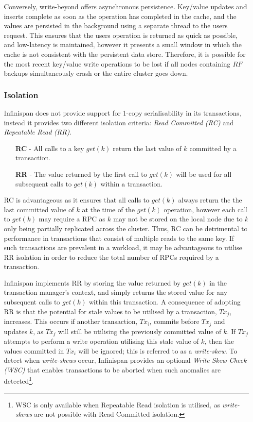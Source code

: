 		    Conversely, write-beyond offers asynchronous persistence.  Key/value updates and inserts complete as soon as the operation has completed in the cache, and the values are persisted in the background using a separate thread to the users request.  This ensures that the users operation is returned as quick as possible, and low-latency is maintained, however it presents a small window in which the cache is not consistent with the persistent data store.  Therefore, it is possible for the most recent key/value write operations to be lost if all nodes containing $RF$ backups simultaneously crash or the entire cluster goes down.  
    
	        \subsubsection*{Isolation}\label{ssec:infi_isolation}
	        Infinispan does not provide support for 1-copy serialisability in its transactions, instead it provides two different isolation criteria: \emph{Read Committed (RC)} and \emph{Repeatable Read (RR)}.  
	        
	        \begin{itemize}
	            \item[\textbf{RC} -] All calls to a key $get(k)$ return the last value of $k$ committed by a transaction.  
	            \item[\textbf{RR} -] The value returned by the first call to $get(k)$ will be used for all subsequent calls to $get(k)$ within a transaction.
	        \end{itemize}   
	        
	        RC is advantageous as it ensures that all calls to $get(k)$ always return the the last committed value of $k$ at the time of the $get(k)$ operation, however each call to $get(k)$ may require a RPC as $k$ may not be stored on the local node due to $k$ only being partially replicated across the cluster. Thus, RC can be detrimental to performance in transactions that consist of multiple reads to the same key.  If such transactions are prevalent in a workload, it may be advantageous to utilise RR isolation in order to reduce the total number of RPCs required by a transaction.  
	        
	        Infinispan implements RR by storing the value returned by $get(k)$ in the transaction manager's context, and simply returns the stored value for any subsequent calls to $get(k)$ within this transaction.  A consequence of adopting RR is that the potential for stale values to be utilised by a transaction, $Tx_j$, increases.  This occurs if another transaction, $Tx_i$, commits before $Tx_j$ and updates $k$, as $Tx_j$ will still be utilising the previously committed value of $k$.  If $Tx_j$ attempts to perform a write operation utilising this stale value of $k$, then the values committed in $Tx_i$ will be ignored; this is referred to as a \emph{write-skew}.  To detect when \emph{write-skews} occur, Infinispan provides an optional \emph{Write Skew Check (WSC)} that enables transactions to be aborted when such anomalies are detected\footnote{WSC is only available when Repeatable Read isolation is utilised, as \emph{write-skews} are not possible with Read Committed isolation.}.  
	        
